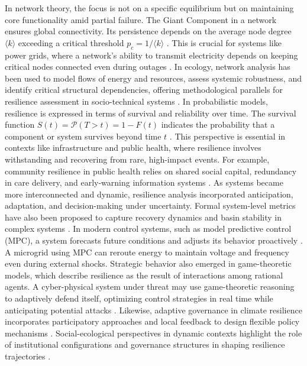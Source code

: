 In network theory, the focus is not on a specific equilibrium but on maintaining core functionality amid partial failure. The Giant Component in a network ensures global connectivity. Its persistence depends on the average node degree $\langle k \rangle$ exceeding a critical threshold $p_c = 1/\langle k \rangle$ \autocite{newman2018networks}. This is crucial for systems like power grids, where a network’s ability to transmit electricity depends on keeping critical nodes connected even during outages \autocite{peng2015invulnerability}. In ecology, network analysis has been used to model flows of energy and resources, assess systemic robustness, and identify critical structural dependencies, offering methodological parallels for resilience assessment in socio-technical systems \autocite{luke2012systems}. In probabilistic models, resilience is expressed in terms of survival and reliability over time. The survival function $S(t) = \mathcal{P}(T > t) = 1 - F(t)$ indicates the probability that a component or system survives beyond time $t$ \autocite{walpole1998probability}. This perspective is essential in contexts like infrastructure and public health, where resilience involves withstanding and recovering from rare, high-impact events. For example, community resilience in public health relies on shared social capital, redundancy in care delivery, and early-warning information systems \autocite{aldrich2015social, haldane2021health}. As systems became more interconnected and dynamic, resilience analysis incorporated anticipation, adaptation, and decision-making under uncertainty. Formal system-level metrics have also been proposed to capture recovery dynamics and basin stability in complex systems \autocite{krakovska2024resilience}. In modern control systems, such as model predictive control (MPC), a system forecasts future conditions and adjusts its behavior proactively \autocite{almassalkhi2015modelpredictive}. A microgrid using MPC can reroute energy to maintain voltage and frequency even during external shocks. Strategic behavior also emerged in game-theoretic models, which describe resilience as the result of interactions among rational agents. A cyber-physical system under threat may use game-theoretic reasoning to adaptively defend itself, optimizing control strategies in real time while anticipating potential attacks \autocite{zhu2015game, myerson2013game}. Likewise, adaptive governance in climate resilience incorporates participatory approaches and local feedback to design flexible policy mechanisms \autocite{lebel2006governance}. Social-ecological perspectives in dynamic contexts highlight the role of institutional configurations and governance structures in shaping resilience trajectories \autocite{anderies2004framework, adger2005socialecological}.\\
